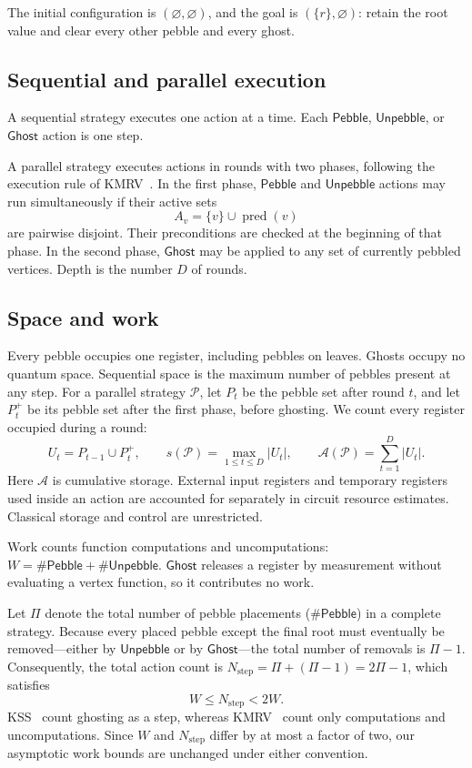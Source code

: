 \documentclass[11pt]{article}
\theoremstyle{definition}
\theoremstyle{remark}
\DeclareMathOperator{\pred}{pred}
\newcommand{\Peb}{\mathsf{Pebble}}
\newcommand{\Unp}{\mathsf{Unpebble}}
\newcommand{\Ghost}{\mathsf{Ghost}}
\newcommand{\Area}{\mathcal A}
\begin{document}
The initial configuration is $(\varnothing,\varnothing)$, and the goal is $(\{r\},\varnothing)$: retain the root value and clear every other pebble and every ghost.

\subsection{Sequential and parallel execution}

A sequential strategy executes one action at a time. Each $\Peb$, $\Unp$, or $\Ghost$ action is one step.

A parallel strategy executes actions in rounds with two phases, following the execution rule of KMRV~\cite[Section~2.1]{KMRV2026}. In the first phase, $\Peb$ and $\Unp$ actions may run simultaneously if their active sets
\begin{equation}
A_v=\{v\}\cup\pred(v)
\label{eq:active-set}
\end{equation}
are pairwise disjoint. Their preconditions are checked at the beginning of that phase. In the second phase, $\Ghost$ may be applied to any set of currently pebbled vertices. Depth is the number $D$ of rounds.

\subsection{Space and work}
\label{sec:work-counts}

Every pebble occupies one register, including pebbles on leaves. Ghosts occupy no quantum space. Sequential space is the maximum number of pebbles present at any step. For a parallel strategy $\mathcal P$, let $P_t$ be the pebble set after round $t$, and let $P_t^+$ be its pebble set after the first phase, before ghosting. We count every register occupied during a round:
\begin{equation}
U_t=P_{t-1}\cup P_t^+, \qquad s(\mathcal P)=\max_{1\le t\le D}|U_t|, \qquad \Area(\mathcal P)=\sum_{t=1}^D|U_t|.
\label{eq:parallel-resources}
\end{equation}
Here $\Area$ is cumulative storage. External input registers and temporary registers used inside an action are accounted for separately in circuit resource estimates. Classical storage and control are unrestricted.

Work counts function computations and uncomputations: $W = \#\Peb + \#\Unp$. $\Ghost$ releases a register by measurement without evaluating a vertex function, so it contributes no work.

Let $\Pi$ denote the total number of pebble placements ($\#\Peb$) in a complete strategy. Because every placed pebble except the final root must eventually be removed—either by $\Unp$ or by $\Ghost$—the total number of removals is $\Pi - 1$. Consequently, the total action count is $N_{\text{step}} = \Pi + (\Pi - 1) = 2\Pi - 1$, which satisfies
\begin{equation}
    W \le N_{\text{step}} < 2W.
\end{equation}
KSS~\cite{KSS2025} count ghosting as a step, whereas
KMRV~\cite{KMRV2026} count only computations and uncomputations.
Since $W$ and $N_{\mathrm{step}}$ differ by at most a factor of two,
our asymptotic work bounds are unchanged under either convention.
\end{document}
